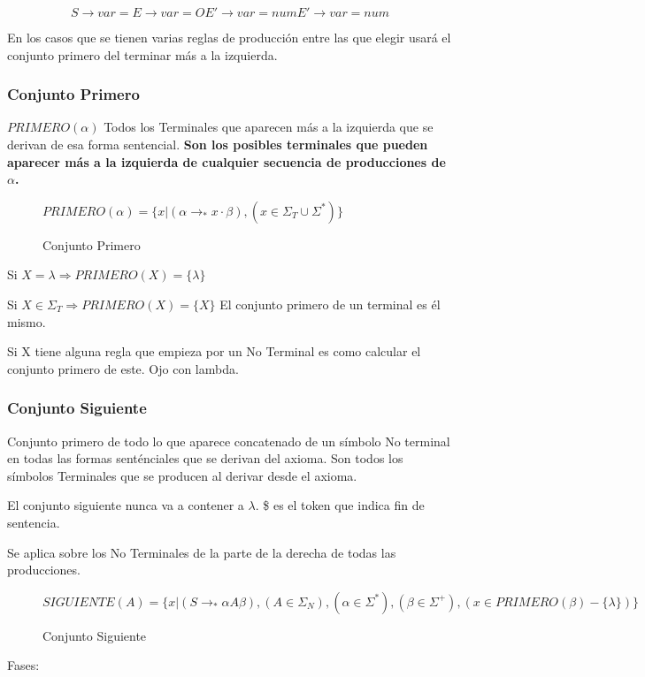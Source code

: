 \documentclass[12pt, twoside, openright]{report} %
\begin{document}
$$S \rightarrow var = E \rightarrow var = O E'\rightarrow var = num E' \rightarrow var = num$$


En los casos que se tienen varias reglas de producción entre las que
elegir usará el conjunto primero del terminar más a la izquierda.


\subsubsection{Conjunto Primero}

\(PRIMERO(\alpha)\) Todos los Terminales que aparecen más a la izquierda
que se derivan de esa forma sentencial. \textbf{Son los posibles
	terminales que pueden aparecer más a la izquierda de cualquier secuencia
	de producciones de \(\alpha\).}
\begin{figure}[H]
	$PRIMERO(\alpha)=\{ x | (\alpha \rightarrow _* x \cdot \beta), (x \in \Sigma_T \cup \Sigma^*)\}$

	\captionsetup{justification=centering}
	\caption{Conjunto Primero}
\end{figure}
Si \(X=\lambda \Rightarrow PRIMERO(X)=\{\lambda\}\)

Si \(X \in \Sigma_T \Rightarrow PRIMERO(X)=\{X\}\) El conjunto primero
de un terminal es él mismo.

Si X tiene alguna regla que empieza por un No Terminal es como calcular
el conjunto primero de este. Ojo con lambda.


\subsubsection{Conjunto Siguiente}

Conjunto primero de todo lo que aparece concatenado de un símbolo No
terminal en todas las formas senténciales que se derivan del axioma. Son
todos los símbolos Terminales que se producen al derivar desde el
axioma.

El conjunto siguiente nunca va a contener a \(\lambda\). \$ es el token
que indica fin de sentencia.

Se aplica sobre los No Terminales de la parte de la derecha de todas las
producciones.
\begin{figure}[H]
	$SIGUIENTE(A)=\{ x | (S \rightarrow _*\alpha A \beta), (A \in \Sigma_N), (\alpha \in \Sigma^*), (\beta \in \Sigma^+),(x\in PRIMERO(\beta)-\{\lambda\})\}$

	\captionsetup{justification=centering}
	\caption{Conjunto Siguiente}
\end{figure}
Fases:
\end{document}
